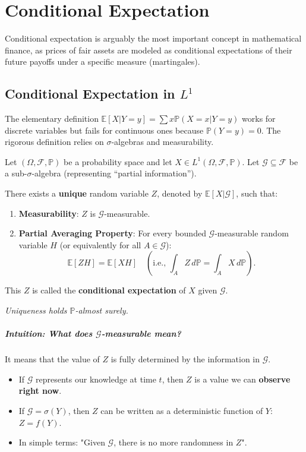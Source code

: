 \chapter{Conditional Expectation}

Conditional expectation is arguably the most important concept in mathematical finance, as prices of fair assets are modeled as conditional expectations of their future payoffs under a specific measure (martingales).

\section{Conditional Expectation in \texorpdfstring{$L^1$}{L1}}

The elementary definition $\mathbb{E}[X|Y=y] = \sum x \mathbb{P}(X=x|Y=y)$ works for discrete variables but fails for continuous ones because $\mathbb{P}(Y=y) = 0$. The rigorous definition relies on $\sigma$-algebras and measurability.

\begin{theorem}
Let $(\Omega, \mathcal{F}, \mathbb{P})$ be a probability space and let $X \in L^1(\Omega, \mathcal{F}, \mathbb{P})$. Let $\mathcal{G} \subseteq \mathcal{F}$ be a sub-$\sigma$-algebra (representing ``partial information'').

There exists a \textbf{unique} random variable $Z$, denoted by $\mathbb{E}[X|\mathcal{G}]$, such that:
\begin{enumerate}
    \item \textbf{Measurability}: $Z$ is $\mathcal{G}$-measurable.
    \item \textbf{Partial Averaging Property}: For every bounded $\mathcal{G}$-measurable random variable $H$ (or equivalently for all $A \in \mathcal{G}$):
    \[
    \mathbb{E}[Z H] = \mathbb{E}[X H] \quad \left( \text{i.e., } \int_A Z \, d\mathbb{P} = \int_A X \, d\mathbb{P} \right).
    \]
\end{enumerate}
This $Z$ is called the \textbf{conditional expectation} of $X$ given $\mathcal{G}$.
\end{theorem}
\textit{Uniqueness holds $\mathbb{P}$-almost surely.}

\paragraph{Intuition: What does \texorpdfstring{$\mathcal{G}$}{G}-measurable mean?}
It means that the value of $Z$ is fully determined by the information in $\mathcal{G}$.
\begin{itemize}
    \item If $\mathcal{G}$ represents our knowledge at time $t$, then $Z$ is a value we can \textbf{observe right now}.
    \item If $\mathcal{G} = \sigma(Y)$, then $Z$ can be written as a deterministic function of $Y$: $Z = f(Y)$.
    \item In simple terms: "Given $\mathcal{G}$, there is no more randomness in $Z$".
\end{itemize}

